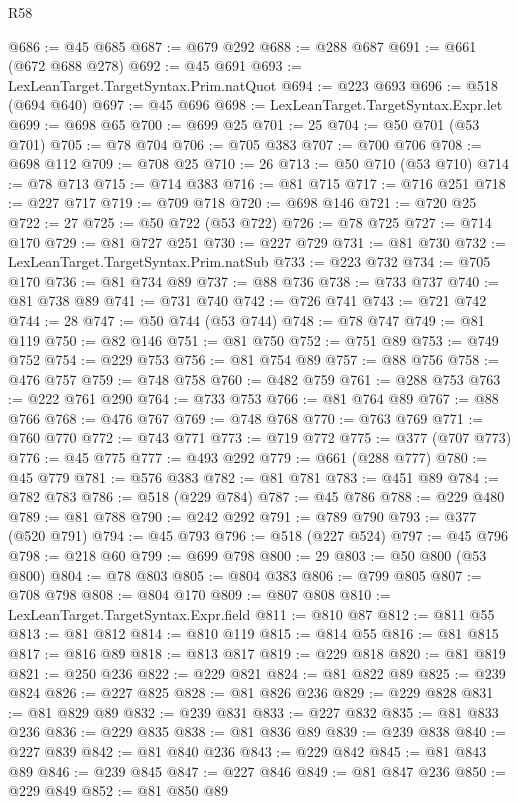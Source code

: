 \begin{lexlean}{R58}
\begin{coremodule}
@686 := @45 @685
@687 := @679 @292
@688 := @288 @687
@691 := @661 (@672 @688 @278)
@692 := @45 @691
@693 := LexLeanTarget.TargetSyntax.Prim.natQuot
@694 := @223 @693
@696 := @518 (@694 @640)
@697 := @45 @696
@698 := LexLeanTarget.TargetSyntax.Expr.let
@699 := @698 @65
@700 := @699 @25
@701 := 25
@704 := @50 @701 (@53 @701)
@705 := @78 @704
@706 := @705 @383
@707 := @700 @706
@708 := @698 @112
@709 := @708 @25
@710 := 26
@713 := @50 @710 (@53 @710)
@714 := @78 @713
@715 := @714 @383
@716 := @81 @715
@717 := @716 @251
@718 := @227 @717
@719 := @709 @718
@720 := @698 @146
@721 := @720 @25
@722 := 27
@725 := @50 @722 (@53 @722)
@726 := @78 @725
@727 := @714 @170
@729 := @81 @727 @251
@730 := @227 @729
@731 := @81 @730
@732 := LexLeanTarget.TargetSyntax.Prim.natSub
@733 := @223 @732
@734 := @705 @170
@736 := @81 @734 @89
@737 := @88 @736
@738 := @733 @737
@740 := @81 @738 @89
@741 := @731 @740
@742 := @726 @741
@743 := @721 @742
@744 := 28
@747 := @50 @744 (@53 @744)
@748 := @78 @747
@749 := @81 @119
@750 := @82 @146
@751 := @81 @750
@752 := @751 @89
@753 := @749 @752
@754 := @229 @753
@756 := @81 @754 @89
@757 := @88 @756
@758 := @476 @757
@759 := @748 @758
@760 := @482 @759
@761 := @288 @753
@763 := @222 @761 @290
@764 := @733 @753
@766 := @81 @764 @89
@767 := @88 @766
@768 := @476 @767
@769 := @748 @768
@770 := @763 @769
@771 := @760 @770
@772 := @743 @771
@773 := @719 @772
@775 := @377 (@707 @773)
@776 := @45 @775
@777 := @493 @292
@779 := @661 (@288 @777)
@780 := @45 @779
@781 := @576 @383
@782 := @81 @781
@783 := @451 @89
@784 := @782 @783
@786 := @518 (@229 @784)
@787 := @45 @786
@788 := @229 @480
@789 := @81 @788
@790 := @242 @292
@791 := @789 @790
@793 := @377 (@520 @791)
@794 := @45 @793
@796 := @518 (@227 @524)
@797 := @45 @796
@798 := @218 @60
@799 := @699 @798
@800 := 29
@803 := @50 @800 (@53 @800)
@804 := @78 @803
@805 := @804 @383
@806 := @799 @805
@807 := @708 @798
@808 := @804 @170
@809 := @807 @808
@810 := LexLeanTarget.TargetSyntax.Expr.field
@811 := @810 @87
@812 := @811 @55
@813 := @81 @812
@814 := @810 @119
@815 := @814 @55
@816 := @81 @815
@817 := @816 @89
@818 := @813 @817
@819 := @229 @818
@820 := @81 @819
@821 := @250 @236
@822 := @229 @821
@824 := @81 @822 @89
@825 := @239 @824
@826 := @227 @825
@828 := @81 @826 @236
@829 := @229 @828
@831 := @81 @829 @89
@832 := @239 @831
@833 := @227 @832
@835 := @81 @833 @236
@836 := @229 @835
@838 := @81 @836 @89
@839 := @239 @838
@840 := @227 @839
@842 := @81 @840 @236
@843 := @229 @842
@845 := @81 @843 @89
@846 := @239 @845
@847 := @227 @846
@849 := @81 @847 @236
@850 := @229 @849
@852 := @81 @850 @89

\end{coremodule}
\end{lexlean}
